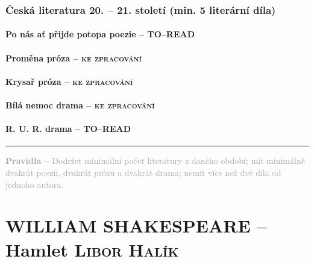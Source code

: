 \documentclass[A4paper]{extarticle} %
\begin{document}
\section*{Česká literatura 20. -- 21. století {\tiny{(min. 5 literární díla)}}}

\subsection*{Po nás ať přijde potopa {\tiny{poezie  -- \textsc{TO--READ}}}}

\subsection*{Proměna {\tiny{próza -- \textsc{ke zpracování}}}}

\subsection*{Krysař {\tiny{próza  -- \textsc{ke zpracování}}}}

\subsection*{Bílá nemoc {\tiny{drama  -- \textsc{ke zpracování}}}}

\subsection*{R. U. R. {\tiny{drama  -- \textsc{TO--READ}}}}

\vfill

\noindent\begin{minipage}{\textwidth}
    \textcolor{darkgray}{\rule{\linewidth}{0.4pt}
    \footnotesize
    \textbf{Pravidla --} Dodržet minimální počet literatury z daného období; mít minimálně dvakrát poezii, dvakrát prózu a dvakrát drama; nemít více než dvě díla od jednoho autora.
    }
\end{minipage}

\pagestyle{empty}


\newpage


\changefontsize{8pt}

\part*{WILLIAM SHAKESPEARE -- Hamlet {\hfill \normalfont\tiny\textsc{Libor Halík}}}
\end{document}
